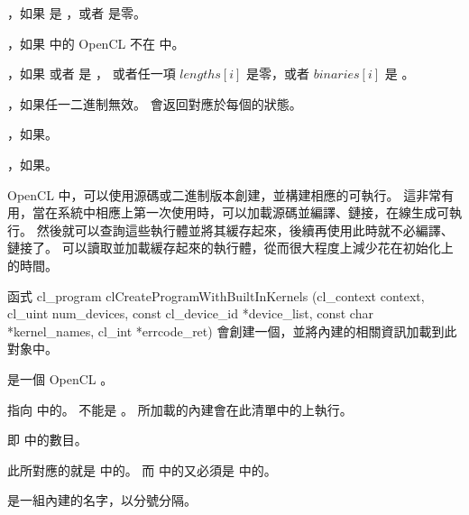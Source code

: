 \item {}，如果  是 ，或者  是零。

\item {}，如果  中的 OpenCL  不在  中。

\item {}，如果  或者  是 ，
或者任一項 $lengths[i]$ 是零，或者 $binaries[i]$ 是 。

\item {}，如果任一二進制無效。  會返回對應於每個的狀態。

\item {}，如果\scdevfailres。

\item {}，如果\schostfailres。
\stopigBase

OpenCL 中，可以使用源碼或二進制版本創建，並構建相應的可執行。
這非常有用，當在系統中相應上第一次使用時，可以加載源碼並編譯、鏈接，在線生成可執行。
然後就可以查詢這些執行體並將其緩存起來，後續再使用此時就不必編譯、鏈接了。
可以讀取並加載緩存起來的執行體，從而很大程度上減少花在初始化上的時間。

函式
\startclc
cl_program clCreateProgramWithBuiltInKernels (cl_context context,
			cl_uint num_devices,
			const cl_device_id *device_list,
			const char *kernel_names,
			cl_int *errcode_ret)
\stopclc
會創建一個，並將內建的相關資訊加載到此對象中。

 是一個 OpenCL 。

 指向  中的。
 不能是 。
所加載的內建會在此清單中的上執行。

 即  中的數目。

此所對應的就是  中的。
而  中的又必須是  中的。

 是一組內建的名字，以分號分隔。

